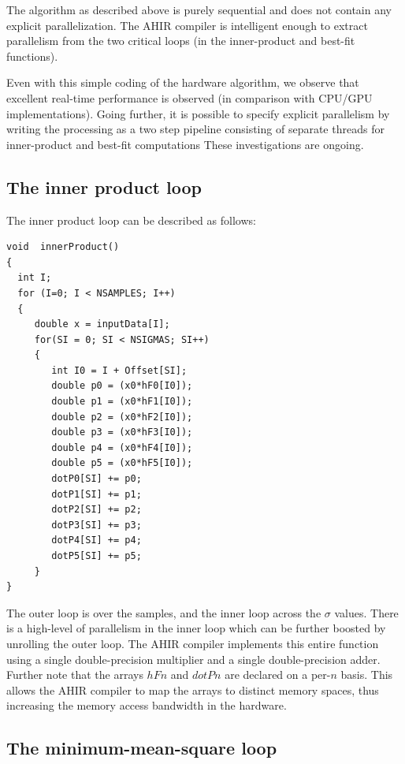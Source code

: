 \documentclass[runningheads]{llncs}
\begin{document}
The algorithm as described above is purely sequential
and does not contain any explicit parallelization.  The AHIR compiler
is intelligent enough to extract parallelism from the two critical
loops (in the inner-product and best-fit functions).

Even with this simple coding of the hardware algorithm,
we observe that excellent real-time performance
is observed (in comparison with CPU/GPU implementations).
Going further, it is possible to specify explicit parallelism by
writing the processing as a two step pipeline consisting
of separate threads for inner-product and best-fit
computations  These investigations are ongoing.



\subsection{The inner product loop} \label{sec:InnerProduct}

The inner product loop can be described as follows:
\begin{verbatim}
void  innerProduct()
{
  int I;
  for (I=0; I < NSAMPLES; I++)
  {
     double x = inputData[I];
     for(SI = 0; SI < NSIGMAS; SI++)
     {
        int I0 = I + Offset[SI];
        double p0 = (x0*hF0[I0]);
        double p1 = (x0*hF1[I0]);
        double p2 = (x0*hF2[I0]);
        double p3 = (x0*hF3[I0]);
        double p4 = (x0*hF4[I0]);
        double p5 = (x0*hF5[I0]);
        dotP0[SI] += p0;
        dotP1[SI] += p1;
        dotP2[SI] += p2;
        dotP3[SI] += p3;
        dotP4[SI] += p4;
        dotP5[SI] += p5;
     }
}
\end{verbatim}
The outer loop is over the samples, and the inner
loop across the $\sigma$ values.  There is a high-level
of parallelism in the inner loop which can be further
boosted by unrolling the outer loop.   The AHIR compiler
implements this entire function using a single double-precision
multiplier and a single double-precision adder.  Further
note that the arrays $hFn$ and $dotPn$ are declared on
a per-$n$ basis. This allows the AHIR compiler to
map the arrays to distinct memory spaces, thus increasing
the memory access bandwidth in the hardware.

\subsection{The minimum-mean-square loop} \label{sec:MMSE}
\end{document}

